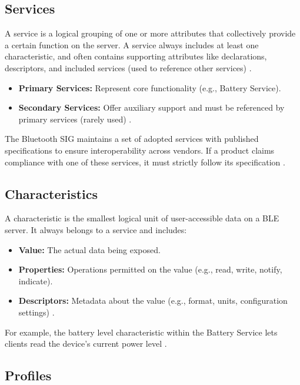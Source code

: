 \subsection{Services}

A service is a logical grouping of one or more attributes that collectively provide a certain function on the server. A service always includes at least one characteristic, and often contains supporting attributes like declarations, descriptors, and included services (used to reference other services) \cite{introtoble}.
\begin{itemize}
    \item \textbf{Primary Services:} Represent core functionality (e.g., Battery Service).
    \item \textbf{Secondary Services:} Offer auxiliary support and must be referenced by primary services (rarely used) \cite{introtoble}.
\end{itemize}

The Bluetooth SIG maintains a set of adopted services with published specifications to ensure interoperability across vendors. If a product claims compliance with one of these services, it must strictly follow its specification \cite{introtoble}.

\subsection{Characteristics}

A characteristic is the smallest logical unit of user-accessible data on a BLE server. It always belongs to a service and includes:
\begin{itemize}
    \item \textbf{Value:} The actual data being exposed.
    \item \textbf{Properties:} Operations permitted on the value (e.g., read, write, notify, indicate).
    \item \textbf{Descriptors:} Metadata about the value (e.g., format, units, configuration settings) \cite{introtoble}.
\end{itemize}

For example, the battery level characteristic within the Battery Service lets clients read the device's current power level \cite{introtoble}.

\subsection{Profiles}

